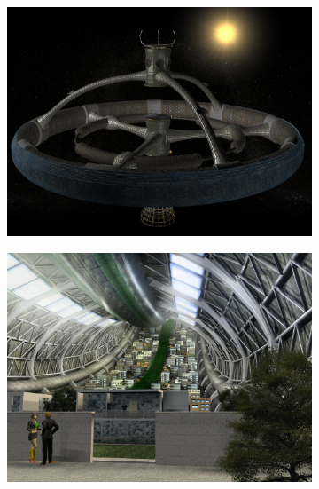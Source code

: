 \documentclass[11pt,a4paper]{report}
\begin{document}
\begin{figure}[H]
 \begin{subfigure}{0.47\textwidth}
 \centering
  \includegraphics[width=\textwidth]{images/station02}
 \end{subfigure}
 \begin{subfigure}{0.47\textwidth}
 \centering
  \includegraphics[width=\textwidth]{images/interior-final}
 \end{subfigure}
 

\end{figure}
\end{document}
